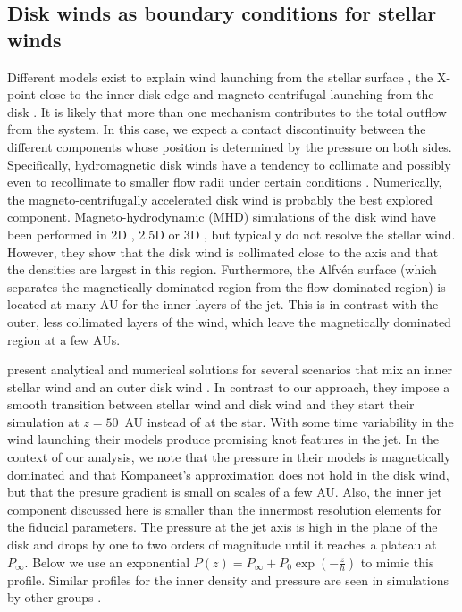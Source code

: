 \documentclass{emulateapj}
\begin{document}
\subsection{Disk winds as boundary conditions for stellar winds}
\label{sect:boundary}
Different models exist to explain wind launching from the stellar surface \citep{1988ApJ...332L..41K,2005ApJ...632L.135M}, the X-point close to the inner disk edge \citep{1994ApJ...429..781S} and magneto-centrifugal launching from the disk \citep{1982MNRAS.199..883B,2005ApJ...630..945A}. It is likely that more than one mechanism contributes to the total outflow from the system. In this case, we expect a contact discontinuity between the different components whose position is determined by the pressure on both sides. Specifically, hydromagnetic disk winds have a tendency to collimate and possibly even to recollimate to smaller flow radii under certain conditions \citep{1982MNRAS.199..883B,1992ApJ...394..117P}.
Numerically, the magneto-centrifugally accelerated disk wind is probably the best explored component. Magneto-hydrodynamic (MHD) simulations of the disk wind have been performed in 2D \citep[e.g.][]{2005ApJ...630..945A}, 2.5D \citep[e.g.][]{2011ApJ...728L..11R} or 3D \citep[e.g.][]{2006ApJ...653L..33A}, but typically do not resolve the stellar wind. However, they show that the disk wind is collimated close to the axis and that the densities are largest in this region. Furthermore, the Alfv\'en surface (which separates the magnetically dominated region from the flow-dominated region) is located at many AU for the inner layers of the jet. This is in contrast with the outer, less collimated layers of the wind, which leave the magnetically dominated region at a few AUs.

\citet{2009A&A...502..217M} present analytical and numerical solutions for several scenarios that mix an inner stellar wind and an outer disk wind \citep[this model has been extended in ][]{2012A&A...545A..53M,2014A&A...562A.117T}. In contrast to our approach, they impose a smooth transition between stellar wind and disk wind and they start their simulation at $z=50$~AU instead of at the star. With some time variability in the wind launching their models produce promising knot features in the jet. In the context of our analysis, we note that the pressure in their models is magnetically dominated and that Kompaneet's approximation does not hold in the disk wind, but that the presure gradient is small on scales of a few AU. Also, the inner jet component discussed here is smaller than the innermost resolution elements for the fiducial parameters. The pressure at the jet axis is high in the plane of the disk and drops by one to two orders of magnitude until it reaches a plateau at $P_\infty$. Below we use an exponential $P(z)=P_\infty+P_0\exp\left(-\frac{z}{h}\right)$ to mimic this profile.
Similar profiles for the inner density and pressure are seen in simulations by other groups \citep[e.g.][]{2005ApJ...630..945A,Li_Krasnopolsky_Blandford_2006,2008ApJ...678.1109M}.
\end{document}
